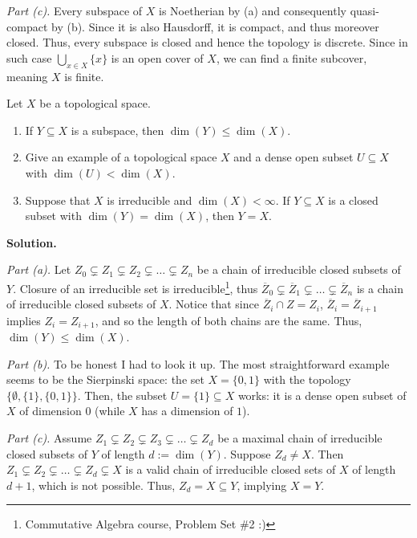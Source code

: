 \documentclass{template}
\begin{document}
\textit{Part (c).} Every subspace of $X$ is Noetherian by (a) and consequently
quasi-compact by (b). Since it is also Hausdorff, it is compact, and thus
moreover closed. Thus, every subspace is closed and hence the topology is
discrete. Since in such case $\bigcup_{x \in X}\{x\}$ is an open cover of $X$,
we can find a finite subcover, meaning $X$ is finite.

\begin{problem}[Exercise 4]
    Let $X$ be a topological space.
    \begin{enumerate}
        \item[(a)] If $Y \subseteq X$ is a subspace, then $\dim(Y) \leq \dim(X)$.
        \item[(b)] Give an example of a topological space $X$ and a dense open 
        subset $U \subseteq X$ with $\dim(U) < \dim(X)$.
        \item[(c)] Suppose that $X$ is irreducible and $\dim(X) < \infty$. If $Y
        \subseteq X$ is a closed subset with $\dim(Y) = \dim(X)$, then $Y=X$.
    \end{enumerate}
\end{problem}

\textbf{Solution.} 

\textit{Part (a).} Let $Z_0 \subsetneq Z_1 \subsetneq Z_2 \subsetneq \dots
\subsetneq Z_n$ be a chain of irreducible closed subsets of $Y$. Closure of an
irreducible set is irreducible\footnote{Commutative Algebra course, Problem Set
\#2 :)}, thus $\overline{Z}_0 \subsetneq \overline{Z}_1 \subsetneq \dots
\subsetneq \overline{Z}_n$ is a chain of irreducible closed subsets of $X$.
Notice that since $\overline{Z}_i \cap Z = Z_i$, $\overline{Z}_i =
\overline{Z}_{i+1}$ implies $Z_i=Z_{i+1}$, and so the length of both chains are
the same. Thus, $\dim(Y) \leq \dim(X)$.

\textit{Part (b).} To be honest I had to look it up. The most straightforward
example seems to be the Sierpinski space: the set $X=\{0,1\}$ with the topology
$\{\emptyset, \{1\}, \{0,1\}\}$. Then, the subset $U = \{1\} \subseteq X$ works:
it is a dense open subset of $X$ of dimension $0$ (while $X$ has a dimension of
$1$).

\textit{Part (c).} Assume $Z_1 \subsetneq Z_2 \subsetneq Z_3 \subsetneq \dots
\subsetneq Z_d$ be a maximal chain of irreducible closed subsets of $Y$ of
length $d:=\dim(Y)$. Suppose $Z_d \neq X$. Then $Z_1 \subsetneq Z_2 \subsetneq
\dots \subsetneq Z_d \subsetneq X$ is a valid chain of irreducible closed sets
of $X$ of length $d+1$, which is not possible. Thus, $Z_d=X \subseteq Y$,
implying $X=Y$.
\end{document}
